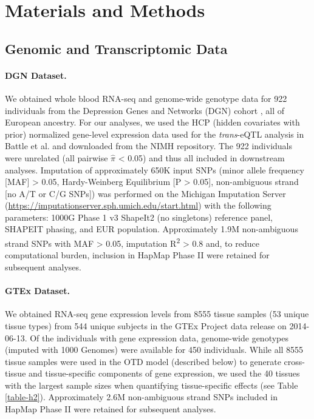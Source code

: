 \documentclass[10pt,letterpaper]{article}
\begin{document}
\section*{Materials and Methods}
\subsection*{Genomic and Transcriptomic
Data}\label{genomic-and-transcriptomic-data}

\paragraph*{DGN Dataset.}\label{dgn-dataset}

We obtained whole blood RNA-seq and genome-wide genotype data for 922
individuals from the Depression Genes and Networks (DGN) cohort
\cite{Battle_2013}, all of European ancestry. For our analyses, we used the HCP
(hidden covariates with prior) normalized gene-level expression data
used for the \emph{trans}-eQTL analysis in Battle et al. \cite{Battle_2013} and
downloaded from the NIMH repository. The 922 individuals were unrelated
(all pairwise \(\hat{\pi}\) \textless{} 0.05) and thus all included in
downstream analyses. Imputation of approximately 650K input SNPs (minor
allele frequency {[}MAF{]} \textgreater{} 0.05, Hardy-Weinberg
Equilibrium {[}P \textgreater{} 0.05{]}, non-ambiguous strand {[}no A/T
or C/G SNPs{]}) was performed on the Michigan
Imputation Server
(\url{https://imputationserver.sph.umich.edu/start.html}) \cite{Howie_2012,Fuchsberger_2014}
with the following parameters: 1000G Phase 1 v3 ShapeIt2 (no singletons)
reference panel, SHAPEIT phasing, and EUR population. Approximately 1.9M
non-ambiguous strand SNPs with MAF \textgreater{} 0.05, imputation
R\textsuperscript{2} \textgreater{} 0.8 and, to reduce computational
burden, inclusion in HapMap Phase II were retained for subsequent
analyses.

\paragraph*{GTEx Dataset.}\label{gtex-dataset}

We obtained RNA-seq gene expression levels from 8555 tissue samples (53
unique tissue types) from 544 unique subjects in the GTEx Project \cite{Ardlie_2015} 
data release on 2014-06-13. Of the individuals with gene
expression data, genome-wide genotypes (imputed with 1000 Genomes) were
available for 450 individuals. While all 8555 tissue samples were used
in the OTD model (described below) to generate cross-tissue and
tissue-specific components of gene expression, we used the 40 tissues
with the largest sample sizes when quantifying tissue-specific effects (see Table \ref{table-h2}).
Approximately 2.6M non-ambiguous strand SNPs included in HapMap Phase II were retained for
subsequent analyses.
\end{document}

